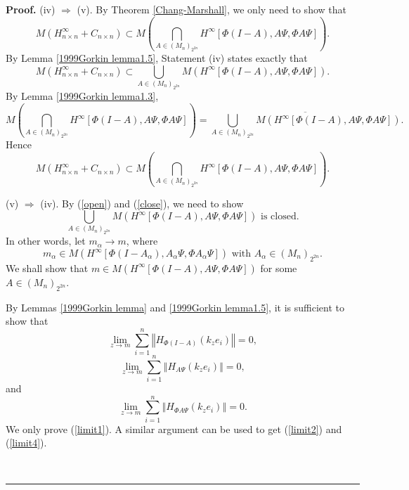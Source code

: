 \documentclass{article}%
\newenvironment{proof}[1][Proof]{\noindent\textbf{#1.} }{\ \rule{0.5em}{0.5em}}
\begin{document}
\begin{proof}
(iv) $\Longrightarrow$ (v). By Theorem \ref{Chang-Marshall}, we only need to
show that%
\[
M\left(  H_{n\times n}^{\infty}+C_{n\times n}\right)  \subset M\left(
\bigcap_{A\in\left(  M_{n}\right)  _{2^{2n}}}H^{\infty}\left[  \Phi
(I-A),A\Psi,\Phi A\Psi\right]  \right)  .
\]
By Lemma \ref{1999Gorkin lemma1.5}, Statement (iv) states exactly that%
\begin{equation}
M\left(  H_{n\times n}^{\infty}+C_{n\times n}\right)  \subset\bigcup
_{A\in\left(  M_{n}\right)  _{2^{2n}}}M\left(  H^{\infty}\left[
\Phi(I-A),A\Psi,\Phi A\Psi\right]  \right)  .\label{open}%
\end{equation}
By Lemma \ref{1999Gorkin lemma1.3},%
\begin{equation}
M\left(  \bigcap_{A\in\left(  M_{n}\right)  _{2^{2n}}}H^{\infty}\left[
\Phi(I-A),A\Psi,\Phi A\Psi\right]  \right)  =\overline{\bigcup_{A\in\left(
M_{n}\right)  _{2^{2n}}}M\left(  H^{\infty}\left[  \Phi(I-A),A\Psi,\Phi
A\Psi\right]  \right)  }.\label{close}%
\end{equation}
Hence%
\[
M\left(  H_{n\times n}^{\infty}+C_{n\times n}\right)  \subset M\left(
\bigcap_{A\in\left(  M_{n}\right)  _{2^{2n}}}H^{\infty}\left[  \Phi
(I-A),A\Psi,\Phi A\Psi\right]  \right)  .
\]


(v) $\Longrightarrow$ (iv). By (\ref{open}) and (\ref{close}), we need to
show
\[
\bigcup_{A\in\left(  M_{n}\right)  _{2^{2n}}}M\left(  H^{\infty}\left[
\Phi(I-A),A\Psi,\Phi A\Psi\right]  \right)  \text{ is closed.}%
\]
In other words, let $m_{\alpha}\rightarrow m$, where
\begin{equation}
m_{\alpha}\in M\left(  H^{\infty}\left[  \Phi(I-A_{\alpha}),A_{\alpha}%
\Psi,\Phi A_{\alpha}\Psi\right]  \right)  \text{ with }A_{\alpha}\in\left(
M_{n}\right)  _{2^{2n}}.\label{alpha}%
\end{equation}
We shall show that $m\in M\left(  H^{\infty}\left[  \Phi(I-A),A\Psi,\Phi
A\Psi\right]  \right)  $ for some $A\in\left(  M_{n}\right)  _{2^{2n}}.$ 

By Lemmas \ref{1999Gorkin lemma} and \ref{1999Gorkin lemma1.5}, it is
sufficient to show that
\begin{equation}
\lim_{z\rightarrow m}\sum_{i=1}^{n}\left\Vert H_{\Phi(I-A)}\left(  k_{z}%
e_{i}\right)  \right\Vert =0,\label{limit1}%
\end{equation}%
\begin{equation}
\lim_{z\rightarrow m}\sum_{i=1}^{n}\left\Vert H_{A\Psi}\left(  k_{z}%
e_{i}\right)  \right\Vert =0,\label{limit2}%
\end{equation}
and
\begin{equation}
\lim_{z\rightarrow m}\sum_{i=1}^{n}\left\Vert H_{\Phi A\Psi}\left(  k_{z}%
e_{i}\right)  \right\Vert =0.\label{limit4}%
\end{equation}
We only prove (\ref{limit1}). A similar argument can be used to get
(\ref{limit2}) and (\ref{limit4}).


\end{proof}
\end{document}
